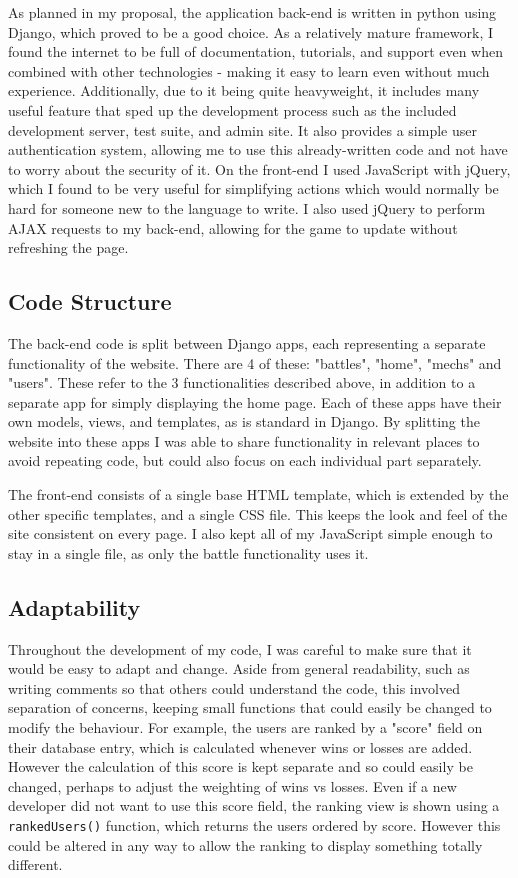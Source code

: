 \documentclass{article}
\begin{document}
As planned in my proposal, the application back-end is written in python using Django, which proved to be a good choice. As a relatively mature framework, I found the internet to be full of documentation, tutorials, and support even when combined with other technologies - making it easy to learn even without much experience. Additionally, due to it being quite heavyweight, it includes many useful feature that sped up the development process such as the included development server, test suite, and admin site. It also provides a simple user authentication system, allowing me to use this already-written code and not have to worry about the security of it. On the front-end I used JavaScript with jQuery, which I found to be very useful for simplifying actions which would normally be hard for someone new to the language to write. I also used jQuery to perform AJAX requests to my back-end, allowing for the game to update without refreshing the page.

\subsection{Code Structure}

The back-end code is split between Django apps, each representing a separate functionality of the website. There are 4 of these: "battles", "home", "mechs" and "users". These refer to the 3 functionalities described above, in addition to a separate app for simply displaying the home page. Each of these apps have their own models, views, and templates, as is standard in Django. By splitting the website into these apps I was able to share functionality in relevant places to avoid repeating code, but could also focus on each individual part separately.

The front-end consists of a single base HTML template, which is extended by the other specific templates, and a single CSS file. This keeps the look and feel of the site consistent on every page. I also kept all of my JavaScript simple enough to stay in a single file, as only the battle functionality uses it.

\subsection{Adaptability}

Throughout the development of my code, I was careful to make sure that it would be easy to adapt and change. Aside from general readability, such as writing comments so that others could understand the code, this involved separation of concerns, keeping small functions that could easily be changed to modify the behaviour. For example, the users are ranked by a "score" field on their database entry, which is calculated whenever wins or losses are added. However the calculation of this score is kept separate and so could easily be changed, perhaps to adjust the weighting of wins vs losses. Even if a new developer did not want to use this score field, the ranking view is shown using a \texttt{rankedUsers()} function, which returns the users ordered by score. However this could be altered in any way to allow the ranking to display something totally different. 
\end{document}
